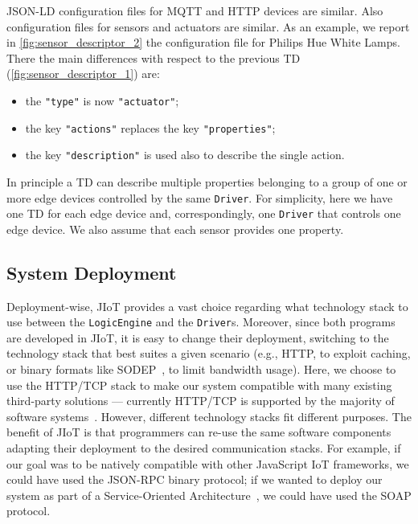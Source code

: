 JSON-LD configuration files for MQTT and HTTP devices are similar. Also
configuration files for sensors and actuators are similar. As an example, we
report in \cref{fig:sensor_descriptor_2} the configuration file for Philips Hue
White Lamps. There the main differences with respect to the previous TD (\cref{fig:sensor_descriptor_1}) are:
%
\begin{itemize}
  
  \item the \lstinline{"type"} is now
  {\small\color{color:comment}\texttt{"actuator"}};

  \item the key \lstinline{"actions"} replaces the key
  \lstinline{"properties"};

  \item the key \lstinline{"description"} is used also to describe the single
  action.

\end{itemize}
%
In principle a TD can describe multiple properties belonging to a group of one
or more edge devices controlled by the same \texttt{Driver}. For simplicity,
here we have one TD for each edge device and, correspondingly, one
\texttt{Driver} that controls one edge device. We also assume that each sensor
provides one property.

\subsection{System Deployment}

Deployment-wise, JIoT provides a vast choice regarding what technology stack to
use between the \texttt{LogicEngine} and the \texttt{Driver}s.
%
Moreover, since both programs are developed in JIoT, it is easy to change their
deployment, switching to the technology stack that best suites a given scenario
(e.g., HTTP, to exploit caching, or binary formats like
SODEP~\cite{MontesiGZ14}, to limit bandwidth usage). Here, we choose to use the
HTTP/TCP stack to make our system compatible with many existing third-party
solutions --- currently HTTP/TCP is supported by the majority of software
systems~\cite{richardson2008restful}. However, different technology stacks fit
different purposes. The benefit of JIoT is that programmers can re-use the same
software components adapting their deployment to the desired communication
stacks. For example, if our goal was to be natively compatible with other
JavaScript IoT frameworks, we could have used the JSON-RPC binary protocol; if
we wanted to deploy our system as part of a Service-Oriented
Architecture~\cite{Erl07}, we could have used the SOAP protocol.

